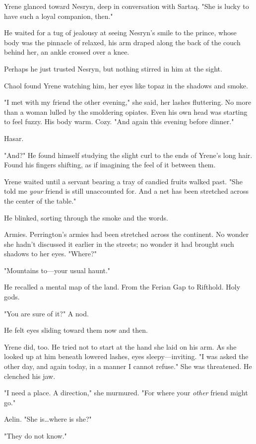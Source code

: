 Yrene glanced toward Nesryn, deep in conversation with Sartaq.
"She is lucky to have such a loyal companion, then."

He waited for a tug of jealousy at seeing Nesryn's smile to the prince, whose body was the pinnacle of relaxed, his arm draped along the back of the couch behind her, an ankle crossed over a knee.

Perhaps he just trusted Nesryn, but nothing stirred in him at the sight.

Chaol found Yrene watching him, her eyes like topaz in the shadows and smoke.

"I met with my friend the other evening," she said, her lashes fluttering.
No more than a woman lulled by the smoldering opiates.
Even his own head was starting to feel fuzzy.
His body warm.
Cozy.
"And again this evening before dinner."

Hasar.

"And?"
He found himself studying the slight curl to the ends of Yrene's long hair.
Found his fingers shifting, as if imagining the feel of it between them.

Yrene waited until a servant bearing a tray of candied fruits walked past.
"She told me \emph{your} friend is still unaccounted for.
And a net has been stretched across the center of the table."

He blinked, sorting through the smoke and the words.

Armies.
Perrington's armies had been stretched across the continent.
No wonder she hadn't discussed it earlier in the streets; no wonder it had brought such shadows to her eyes.
"Where?"

"Mountains to---your usual haunt."

He recalled a mental map of the land.
From the Ferian Gap to Rifthold.
Holy gods.

"You are sure of it?"
A nod.

He felt eyes sliding toward them now and then.

Yrene did, too.
He tried not to start at the hand she laid on his arm.
As she looked up at him beneath lowered lashes, eyes sleepy---inviting.
"I was asked the other day, and again today, in a manner I cannot refuse."
She was threatened.
He clenched his jaw.

"I need a place.
A direction," she murmured.
"For where your \emph{other} friend might go."

Aelin.
"She is\ldots where is she?"

"They do not know."

